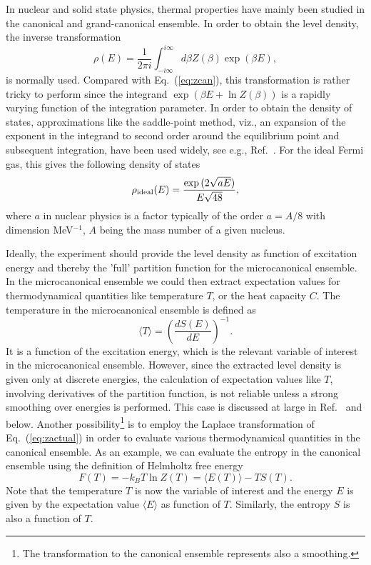 In nuclear and solid state physics, thermal properties have mainly been studied in the canonical and grand-canonical ensemble. In order to obtain the level density, the inverse transformation 
\begin{equation}
      \rho(E) =\frac{1}{2\pi i}\int_{-i\infty}^{i\infty}
 d\beta Z(\beta) \exp{(\beta E)},
      \label{eq:zbigcan}
\end{equation}
is normally used. Compared with Eq.\ (\ref{eq:zcan}), this transformation is rather tricky to perform since the integrand $\exp{\left(\beta E+ \ln Z(\beta)\right)}$ is a rapidly varying function of the integration parameter. In order to obtain the density of states, approximations like the saddle-point method, viz., an expansion of the exponent in the integrand to second order around the equilibrium point and subsequent integration, have been used widely,
see e.g., Ref.\ \cite{david,yoram}. 
For the ideal Fermi gas, this gives the following density of states
\begin{equation}
      \rho_{\rm ideal}(E)=\frac{\exp{(2\sqrt{aE})}}{E\sqrt{48}},
      \label{eq:omegaideal}
\end{equation}
where $a$ in nuclear physics is a factor typically of the order $a=A/8$ with dimension MeV$^{-1}$, $A$ being the mass number of a given nucleus. 

Ideally, the experiment should provide the level density as function of excitation energy and thereby the 'full' partition function for the microcanonical ensemble. In the microcanonical ensemble we could then extract expectation values for thermodynamical quantities like temperature $T$, or the heat capacity $C$. The temperature in the microcanonical ensemble is defined as 
\begin{equation}
      \langle T\rangle=\left(\frac{dS(E)}{dE}\right)^{-1}.
      \label{eq:temp}
\end{equation}
It is a function of the excitation energy, which is the relevant variable of interest in the microcanonical ensemble. However, since the extracted level density is given only at discrete energies, the calculation of expectation values like $T$, involving derivatives of the partition function, is not reliable unless a strong smoothing over energies is performed. This case is discussed at large in Ref.\ \cite{9} and below. Another possibility\footnote{The transformation to the canonical ensemble represents also a smoothing.} is to employ the Laplace transformation of Eq.~(\ref{eq:zactual}) in order to evaluate various thermodynamical quantities in the canonical ensemble. As an example, we can evaluate the entropy in the canonical ensemble using the definition of Helmholtz free energy \begin{equation}
     F(T)= -k_B T \ln Z(T)=\langle E(T)\rangle - TS(T).
\end{equation}
Note that the temperature $T$ is now the variable of interest and the energy $E$ is given by the expectation value $\langle E\rangle$ as function of $T$. Similarly, the entropy $S$ is also a function of $T$.


